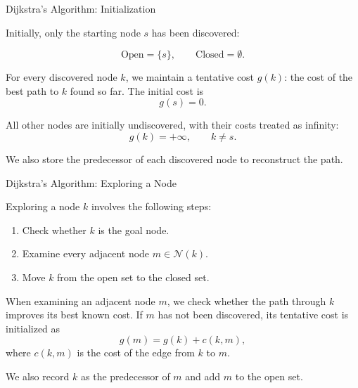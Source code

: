 \documentclass{beamer}
\begin{document}
\begin{frame}{Dijkstra's Algorithm: Initialization}
	\begin{flushleft}
		
		Initially, only the starting node $s$ has been
		discovered:
		
		\[
		\text{Open}=\{s\},
		\qquad
		\text{Closed}=\emptyset.
		\]
		
		For every discovered node $k$, we maintain a
		tentative cost $g(k)$: the cost of the best path
		to $k$ found so far. The initial cost is
		\[
		g(s)=0.
		\]
		
		All other nodes are initially undiscovered, with
		their costs treated as infinity:
		\[
		g(k)=+\infty,\qquad k\ne s.
		\]
		
		We also store the predecessor of each discovered
		node to reconstruct the path.
		
	\end{flushleft}
\end{frame}

\begin{frame}{Dijkstra's Algorithm: Exploring a Node}
	\begin{flushleft}
		
		Exploring a node $k$ involves the following steps:
		
		\begin{enumerate}
			\item Check whether $k$ is the goal node.
			\item Examine every adjacent node $m\in\mathcal{N}(k)$.
			\item Move $k$ from the open set to the
			closed set.
		\end{enumerate}
		
		
		\medskip
		When examining an adjacent node $m$, we check
		whether the path through $k$ improves its
		best known cost. If $m$ has not been discovered, its tentative
		cost is initialized as
		\[
		g(m)=g(k)+c(k,m),
		\]
		where $c(k,m)$ is the cost of the edge from
		$k$ to $m$.
		
		We also record $k$ as the predecessor of $m$
		and add $m$ to the open set.
		
	\end{flushleft}
\end{frame}
\end{document}

